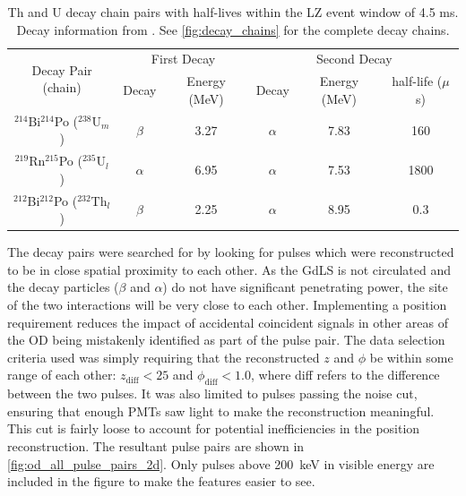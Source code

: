 \begin{table}[]
    \centering
    \begin{tabular}{c|c|c|c|c|c}
        \multirow{2}{*}{Decay Pair (chain)}                    & \multicolumn{2}{c|}{First Decay}   & \multicolumn{3}{c}{Second Decay}    \\ 
                                                               & Decay    & Energy (MeV) & Decay    & Energy (MeV) & half-life ($\mu$s) \\ \hline
        ${}^{214}$Bi${}^{214}$Po (${}^{238}$U$_{m}$)          & $\beta$  & 3.27         & $\alpha$ & 7.83         & 160   \\ 
        ${}^{219}$Rn${}^{215}$Po (${}^{235}$U$_{l}$)          & $\alpha$ & 6.95         & $\alpha$ & 7.53         & 1800  \\ 
        ${}^{212}$Bi${}^{212}$Po (${}^{232}$Th$_{l}$)         & $\beta$  & 2.25         & $\alpha$ & 8.95         & 0.3
    \end{tabular}
    \caption{Th and U decay chain pairs with half-lives within the LZ event window of 4.5 ms. 
             Decay information from \cite{radon_chains_ref}.
             See \autoref{fig:decay_chains} for the complete decay chains.}
    \label{tab:od_constrainable_decays_in_data}
\end{table}

\par
The decay pairs were searched for by looking for pulses which were reconstructed to be in close spatial proximity to each other.
As the GdLS is not circulated and the decay particles ($\beta$ and $\alpha$) do not have significant penetrating power, the site of the two interactions will be very close to each other.
Implementing a position requirement reduces the impact of accidental coincident signals in other areas of the OD being mistakenly identified as part of the pulse pair.
The data selection criteria used was simply requiring that the reconstructed $z$ and $\phi$ be within some range of each other: $z_{\text{diff}} < 25$ and $\phi_{\text{diff}} < 1.0$, where diff refers to the difference between the two pulses.
It was also limited to pulses passing the noise cut, ensuring that enough PMTs saw light to make the reconstruction meaningful.
This cut is fairly loose to account for potential inefficiencies in the position reconstruction.
The resultant pulse pairs are shown in \autoref{fig:od_all_pulse_pairs_2d}.
Only pulses above 200~keV in visible energy are included in the figure to make the features easier to see.


